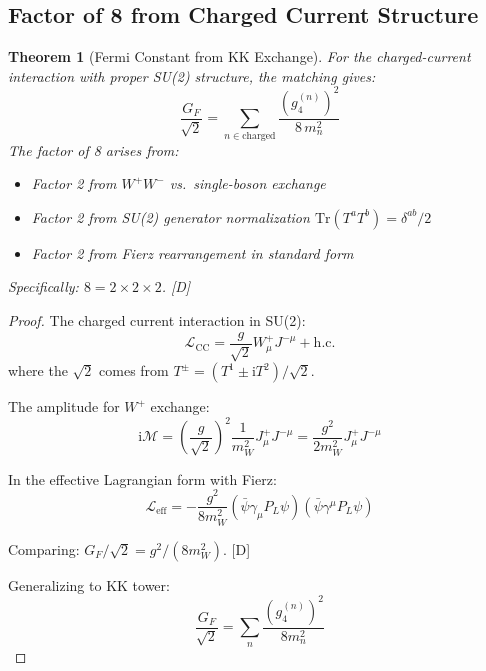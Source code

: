 \documentclass[11pt,a4paper]{article}
\newtheorem{theorem}{Theorem}[section]
\newcommand{\Tr}{\mathrm{Tr}}
\newcommand{\ii}{\mathrm{i}}
\begin{document}
\subsection{Factor of 8 from Charged Current Structure}

\begin{theorem}[Fermi Constant from KK Exchange]
\label{thm:gf}
For the charged-current interaction with proper SU(2) structure, the matching gives:
\begin{equation}
\boxed{
\frac{G_F}{\sqrt{2}} = \sum_{n \in \text{charged}} \frac{(g_4^{(n)})^2}{8\, m_n^2}
}
\label{eq:gf-main}
\end{equation}
The factor of 8 arises from:
\begin{itemize}
\item Factor 2 from $W^+ W^-$ vs.\ single-boson exchange
\item Factor 2 from SU(2) generator normalization $\Tr(T^a T^b) = \delta^{ab}/2$
\item Factor 2 from Fierz rearrangement in standard form
\end{itemize}
Specifically: $8 = 2 \times 2 \times 2$. [D]
\end{theorem}

\begin{proof}
The charged current interaction in SU(2):
\begin{equation}
\mathcal{L}_{\text{CC}} = \frac{g}{\sqrt{2}} W_\mu^+ J^{-\mu} + \text{h.c.}
\label{eq:cc-lagrangian}
\end{equation}
where the $\sqrt{2}$ comes from $T^{\pm} = (T^1 \pm \ii T^2)/\sqrt{2}$.

The amplitude for $W^+$ exchange:
\begin{equation}
\ii\mathcal{M} = \left(\frac{g}{\sqrt{2}}\right)^2 \frac{1}{m_W^2} J_\mu^+ J^{-\mu}
= \frac{g^2}{2m_W^2} J_\mu^+ J^{-\mu}
\label{eq:cc-amplitude}
\end{equation}

In the effective Lagrangian form with Fierz:
\begin{equation}
\mathcal{L}_{\text{eff}} = -\frac{g^2}{8m_W^2}
(\bar{\psi} \gamma_\mu P_L \psi)(\bar{\psi} \gamma^\mu P_L \psi)
\label{eq:eff-with-8}
\end{equation}

Comparing: $G_F/\sqrt{2} = g^2/(8m_W^2)$. [D]

Generalizing to KK tower:
\begin{equation}
\frac{G_F}{\sqrt{2}} = \sum_{n} \frac{(g_4^{(n)})^2}{8m_n^2}
\label{eq:gf-tower}
\end{equation}
\end{proof}
\end{document}
